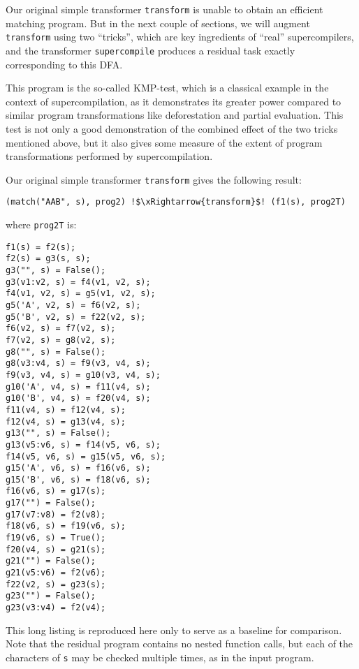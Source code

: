 Our original simple transformer \texttt{transform} is unable to obtain an efficient matching program.
But in the next couple of sections, we will augment \texttt{transform} using two ``tricks'',
which are key ingredients of ``real'' supercompilers, and the transformer \texttt{supercompile} produces
a residual task exactly corresponding to this DFA.

This program is the so-called KMP-test, which is
a classical example in the context of supercompilation, as it demonstrates its greater
power compared to similar program transformations like deforestation and partial
evaluation\cite{Sorensen1994TurchinSupercompiler,Sorensen1998Introduction}.
This test is not only a good demonstration of the combined effect of the two tricks mentioned above,
but it also gives some measure of the extent of program transformations performed by supercompilation.


Our original simple transformer \texttt{transform} gives the following result:
\begin{lstlisting}[language=sll,escapechar=!]
(match("AAB", s), prog2) !$\xRightarrow{transform}$! (f1(s), prog2T)
\end{lstlisting}
where \texttt{prog2T} is:
\begin{lstlisting}[language=sll]
f1(s) = f2(s);
f2(s) = g3(s, s);
g3("", s) = False();
g3(v1:v2, s) = f4(v1, v2, s);
f4(v1, v2, s) = g5(v1, v2, s);
g5('A', v2, s) = f6(v2, s);
g5('B', v2, s) = f22(v2, s);
f6(v2, s) = f7(v2, s);
f7(v2, s) = g8(v2, s);
g8("", s) = False();
g8(v3:v4, s) = f9(v3, v4, s);
f9(v3, v4, s) = g10(v3, v4, s);
g10('A', v4, s) = f11(v4, s);
g10('B', v4, s) = f20(v4, s);
f11(v4, s) = f12(v4, s);
f12(v4, s) = g13(v4, s);
g13("", s) = False();
g13(v5:v6, s) = f14(v5, v6, s);
f14(v5, v6, s) = g15(v5, v6, s);
g15('A', v6, s) = f16(v6, s);
g15('B', v6, s) = f18(v6, s);
f16(v6, s) = g17(s);
g17("") = False();
g17(v7:v8) = f2(v8);
f18(v6, s) = f19(v6, s);
f19(v6, s) = True();
f20(v4, s) = g21(s);
g21("") = False();
g21(v5:v6) = f2(v6);
f22(v2, s) = g23(s);
g23("") = False();
g23(v3:v4) = f2(v4);
\end{lstlisting}
This long listing is reproduced here only to serve as a baseline for comparison.
Note that the residual program contains no nested function calls,
but each of the characters of \texttt{s} may be checked multiple times, as in the input program.


